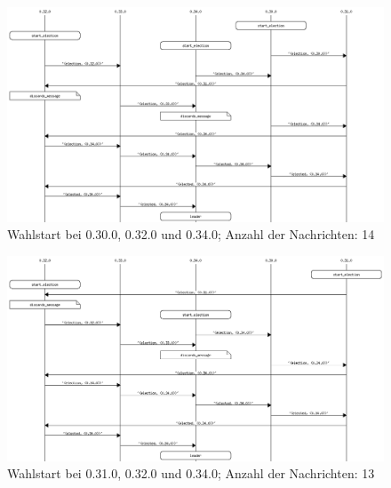 \documentclass[a4paper,
12pt,
BCOR12mm,
]{scrartcl}
\theoremstyle{break}
\begin{document}
 \begin{figure}
   \begin{center}
     \includegraphics[scale=0.4]{../src/msc/concurrent_with_0.30.00.32.00.34.0.png}
   \end{center}
   \caption{Wahlstart bei 0.30.0, 0.32.0 und 0.34.0; Anzahl der Nachrichten: 14}
   \label{fig:s_303234}
 \end{figure}

 \begin{figure}
   \begin{center}
     \includegraphics[scale=0.4]{../src/msc/concurrent_with_0.31.00.32.00.34.0.png}
   \end{center}
   \caption{Wahlstart bei 0.31.0, 0.32.0 und 0.34.0; Anzahl der Nachrichten: 13}
   \label{fig:s_313234}
 \end{figure}
\end{document}
